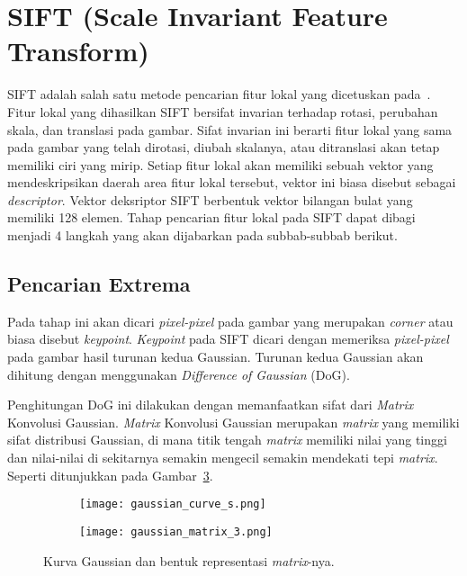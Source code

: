 \section{SIFT (Scale Invariant Feature Transform)}
\label{sec:sift}
SIFT adalah salah satu metode pencarian fitur lokal yang dicetuskan pada~\cite{lowe2004sift}. Fitur lokal yang dihasilkan SIFT bersifat invarian terhadap rotasi, perubahan skala, dan translasi pada gambar. Sifat invarian ini berarti fitur lokal yang sama pada gambar yang telah dirotasi, diubah skalanya, atau ditranslasi akan tetap memiliki ciri yang mirip. Setiap fitur lokal akan memiliki sebuah vektor yang mendeskripsikan daerah area fitur lokal tersebut, vektor ini biasa disebut sebagai \textit{descriptor}. Vektor deksriptor SIFT berbentuk vektor bilangan bulat yang memiliki 128 elemen. Tahap pencarian fitur lokal pada SIFT dapat dibagi menjadi 4 langkah yang akan dijabarkan pada subbab-subbab berikut.

\subsection{Pencarian Extrema}
Pada tahap ini akan dicari \textit{pixel-pixel} pada gambar yang merupakan \textit{corner} atau biasa disebut \textit{keypoint}. \textit{Keypoint} pada SIFT dicari dengan memeriksa \textit{pixel-pixel} pada gambar hasil turunan kedua Gaussian. Turunan kedua Gaussian akan dihitung dengan menggunakan \textit{Difference of Gaussian} (DoG).

Penghitungan DoG ini dilakukan dengan memanfaatkan sifat dari \textit{Matrix} Konvolusi Gaussian. \textit{Matrix} Konvolusi Gaussian merupakan \textit{matrix} yang memiliki sifat distribusi Gaussian, di mana titik tengah \textit{matrix} memiliki nilai yang tinggi dan nilai-nilai di sekitarnya semakin mengecil semakin mendekati tepi \textit{matrix}. Seperti ditunjukkan pada Gambar~\ref{fig:gaussian_function}. 

\begin{figure}[H]
	\begin{subfigure}[b]{.5\textwidth}
		\centering
		\texttt{[image: gaussian\_curve\_s.png]}
		\caption{}
		\label{subfig:gaussian_curve}
	\end{subfigure}%
	\begin{subfigure}[b]{.5\textwidth}
		\centering
		\texttt{[image: gaussian\_matrix\_3.png]}
		\caption{}
		\label{subfig:gaussian_matrix}
	\end{subfigure}
	\caption{Kurva Gaussian dan bentuk representasi \textit{matrix}-nya.}
	\label{fig:gaussian_function}
\end{figure}

